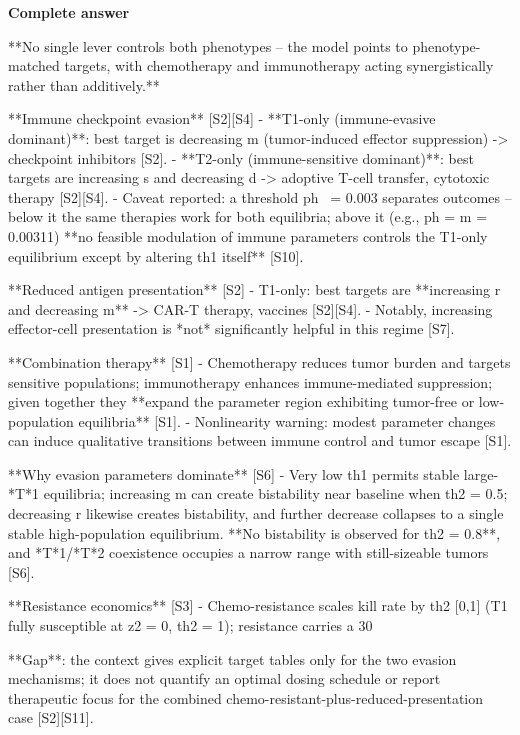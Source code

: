 \documentclass[10pt]{article}
\begin{document}
\textbf{Complete answer}
\begin{AnswerText}
**No single lever controls both phenotypes -- the model points to phenotype-matched targets, with chemotherapy and immunotherapy acting synergistically rather than additively.**

**Immune checkpoint evasion** [S2][S4]
- **T1-only (immune-evasive dominant)**: best target is decreasing m (tumor-induced effector suppression) -> checkpoint inhibitors [S2].
- **T2-only (immune-sensitive dominant)**: best targets are increasing s and decreasing d -> adoptive T-cell transfer, cytotoxic therapy [S2][S4].
- Caveat reported: a threshold ph ~= 0.003 separates outcomes -- below it the same therapies work for both equilibria; above it (e.g., ph = m = 0.00311) **no feasible modulation of immune parameters controls the T1-only equilibrium except by altering th1 itself** [S10].

**Reduced antigen presentation** [S2]
- T1-only: best targets are **increasing r and decreasing m** -> CAR-T therapy, vaccines [S2][S4].
- Notably, increasing effector-cell presentation is *not* significantly helpful in this regime [S7].

**Combination therapy** [S1]
- Chemotherapy reduces tumor burden and targets sensitive populations; immunotherapy enhances immune-mediated suppression; given together they **expand the parameter region exhibiting tumor-free or low-population equilibria** [S1].
- Nonlinearity warning: modest parameter changes can induce qualitative transitions between immune control and tumor escape [S1].

**Why evasion parameters dominate** [S6]
- Very low th1 permits stable large-*T*1 equilibria; increasing m can create bistability near baseline when th2 = 0.5; decreasing r likewise creates bistability, and further decrease collapses to a single stable high-population equilibrium. **No bistability is observed for th2 = 0.8**, and *T*1/*T*2 coexistence occupies a narrow range with still-sizeable tumors [S6].

**Resistance economics** [S3]
- Chemo-resistance scales kill rate by th2  [0,1] (T1 fully susceptible at z2 = 0, th2 = 1); resistance carries a 30%

**Gap**: the context gives explicit target tables only for the two evasion mechanisms; it does not quantify an optimal dosing schedule or report therapeutic focus for the combined chemo-resistant-plus-reduced-presentation case [S2][S11].
\end{AnswerText}
\end{document}
